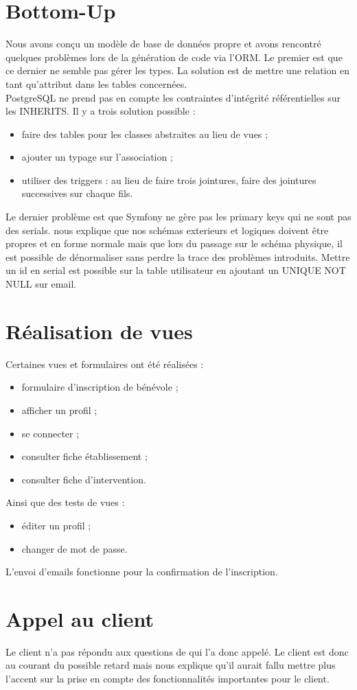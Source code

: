 \documentclass [a4paper] {article}
\begin{document}
\section{Bottom-Up}
Nous avons conçu un modèle de base de données propre et avons rencontré quelques problèmes lors de la génération de code via l'ORM. Le premier est que ce dernier ne semble pas gérer les types. La solution est de mettre une relation en tant qu'attribut dans les tables concernées. \\
PostgreSQL ne prend pas en compte les contraintes d'intégrité référentielles sur les INHERITS. Il y a trois solution possible :
\begin{itemize}
\item faire des tables pour les classes abstraites au lieu de vues ;
\item ajouter un typage sur l'association ;
\item utiliser des triggers : au lieu de faire trois jointures, faire des jointures successives sur chaque fils.
\end{itemize}

Le dernier problème est que Symfony ne gère pas les primary keys qui ne sont pas des serials. \nomTuteurPedago{} nous explique que nos schémas exterieurs et logiques doivent être propres et en forme normale mais que lors du passage sur le schéma physique, il est possible de dénormaliser sans perdre la trace des problèmes introduits. Mettre un id en serial est possible sur la table utilisateur en ajoutant un UNIQUE NOT NULL sur email.

\section{Réalisation de vues}
Certaines vues et formulaires ont été réalisées :
\begin{itemize}
\item formulaire d'inscription de bénévole ;
\item afficher un profil ;
\item se connecter ;
\item consulter fiche établissement ;
\item consulter fiche d'intervention.
\end{itemize}
Ainsi que des tests de vues : 
\begin{itemize}
\item éditer un profil ;
\item changer de mot de passe.
\end{itemize}

L'envoi d'emails fonctionne pour la confirmation de l'inscription.

\section{Appel au client}
Le client n'a pas répondu aux questions de \Sergi{} qui l'a donc appelé. Le client est donc au courant du possible retard mais \nomTuteurPedago{} nous explique qu'il aurait fallu mettre plus l'accent sur la prise en compte des fonctionnalités importantes pour le client.


\newpage
\end{document}

